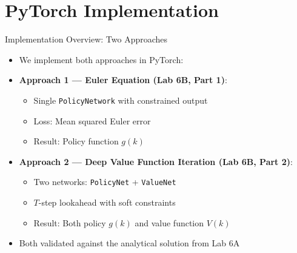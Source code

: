 \documentclass[10pt,english,aspectratio=169]{beamer}
\begin{document}
\section{PyTorch Implementation}

\begin{frame}{Implementation Overview: Two Approaches}
\begin{itemize}
  \item We implement both approaches in PyTorch:
  \medskip
  \item \textbf{Approach 1 --- Euler Equation (Lab 6B, Part 1)}:
    \begin{itemize}
      \item Single \texttt{PolicyNetwork} with constrained output
      \item Loss: Mean squared Euler error
      \item Result: Policy function $g(k)$
    \end{itemize}
  \medskip
  \item \textbf{Approach 2 --- Deep Value Function Iteration (Lab 6B, Part 2)}:
    \begin{itemize}
      \item Two networks: \texttt{PolicyNet} + \texttt{ValueNet}
      \item $T$-step lookahead with soft constraints
      \item Result: Both policy $g(k)$ and value function $V(k)$
    \end{itemize}
  \medskip
  \item Both validated against the analytical solution from Lab 6A
\end{itemize}
\end{frame}
\end{document}
